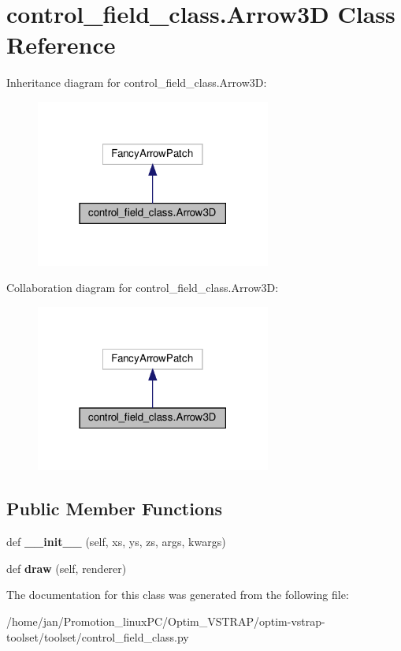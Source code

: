 \hypertarget{classcontrol__field__class_1_1Arrow3D}{}\section{control\+\_\+field\+\_\+class.\+Arrow3D Class Reference}
\label{classcontrol__field__class_1_1Arrow3D}


Inheritance diagram for control\+\_\+field\+\_\+class.\+Arrow3D\+:\nopagebreak
\begin{figure}[H]
\begin{center}
\leavevmode
\includegraphics[width=219pt]{classcontrol__field__class_1_1Arrow3D__inherit__graph}
\end{center}
\end{figure}


Collaboration diagram for control\+\_\+field\+\_\+class.\+Arrow3D\+:\nopagebreak
\begin{figure}[H]
\begin{center}
\leavevmode
\includegraphics[width=219pt]{classcontrol__field__class_1_1Arrow3D__coll__graph}
\end{center}
\end{figure}
\subsection*{Public Member Functions}
\begin{DoxyCompactItemize}
\item 
\mbox{\label{classcontrol__field__class_1_1Arrow3D_af98fc15e10ed35ec3cfaba0db76e7339}} 
def {\bfseries \+\_\+\+\_\+init\+\_\+\+\_\+} (self, xs, ys, zs, args, kwargs)
\item 
\mbox{\label{classcontrol__field__class_1_1Arrow3D_a467839333d88e604fef2abca849b9311}} 
def {\bfseries draw} (self, renderer)
\end{DoxyCompactItemize}


The documentation for this class was generated from the following file\+:\begin{DoxyCompactItemize}
\item 
/home/jan/\+Promotion\+\_\+linux\+P\+C/\+Optim\+\_\+\+V\+S\+T\+R\+A\+P/optim-\/vstrap-\/toolset/toolset/control\+\_\+field\+\_\+class.\+py\end{DoxyCompactItemize}
